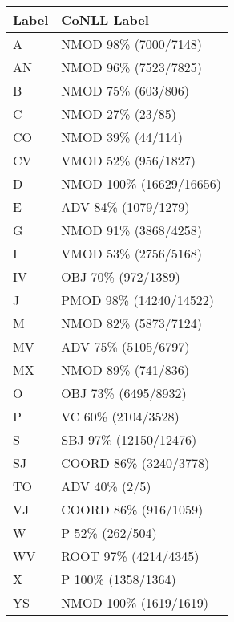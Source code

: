 \begin{tiny}
\centering
\begin{tabular}{|l|l|}
\hline
Label & CoNLL Label\\\hline

\hline

A & NMOD 98\% (7000/7148) \\
AN & NMOD 96\% (7523/7825) \\
B & NMOD 75\% (603/806) \\
C & NMOD 27\% (23/85) \\
CO & NMOD 39\% (44/114) \\
CV & VMOD 52\% (956/1827) \\
D & NMOD 100\% (16629/16656) \\
E & ADV 84\% (1079/1279) \\
G & NMOD 91\% (3868/4258) \\
I & VMOD 53\% (2756/5168) \\
IV & OBJ 70\% (972/1389) \\
J & PMOD 98\% (14240/14522) \\
M & NMOD 82\% (5873/7124) \\
MV & ADV 75\% (5105/6797) \\
MX & NMOD 89\% (741/836) \\
O & OBJ 73\% (6495/8932) \\
P & VC 60\% (2104/3528) \\
S & SBJ 97\% (12150/12476) \\
SJ & COORD 86\% (3240/3778) \\
TO & ADV 40\% (2/5) \\
VJ & COORD 86\% (916/1059) \\
W & P 52\% (262/504) \\
WV & ROOT 97\% (4214/4345) \\
X & P 100\% (1358/1364) \\
YS & NMOD 100\% (1619/1619) \\
\hline
\end{tabular}
\end{tiny}
